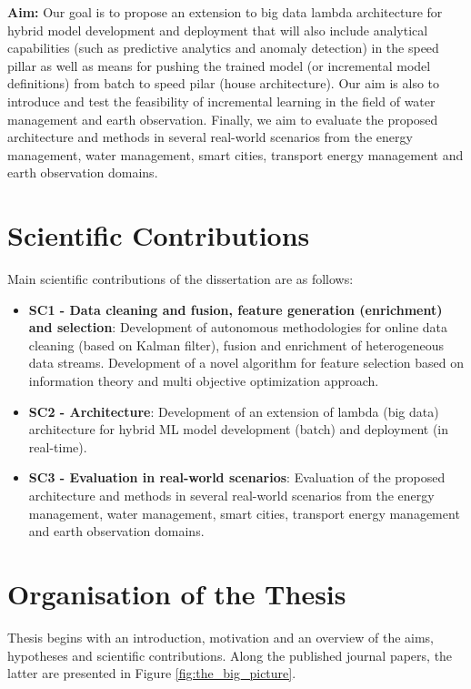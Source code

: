 \begin{itemize}
    \textbf{Aim:}
    Our goal is to propose an extension to big data lambda architecture for hybrid model development and deployment that will also include analytical capabilities (such as predictive analytics and anomaly detection) in the speed pillar as well as means for pushing the trained model (or incremental model definitions) from batch to speed pilar (house architecture).
    Our aim is also to introduce and test the feasibility of incremental learning in the field of water management and earth observation.
    Finally, we aim to evaluate the proposed architecture and methods in several real-world scenarios from the energy management, water management, smart cities, transport energy management and earth observation domains.
    
\end{itemize}

\section{Scientific Contributions}

Main scientific contributions of the dissertation are as follows:

\begin{itemize}    
    \item \textbf{SC1 - Data cleaning and fusion, feature generation (enrichment) and selection}: Development of autonomous methodologies for online data cleaning (based on Kalman filter), fusion and enrichment of heterogeneous data streams. Development of a novel algorithm for feature selection based on information theory and multi objective optimization approach.
    \item \textbf{SC2 - Architecture}: Development of an extension of lambda (big data) architecture for hybrid ML model development (batch) and deployment (in real-time).
    \item \textbf{SC3 - Evaluation in real-world scenarios}: Evaluation of the proposed architecture and methods in several real-world scenarios from the energy management, water management, smart cities, transport energy management and earth observation domains.
\end{itemize}

\section{Organisation of the Thesis}

Thesis begins with an introduction, motivation and an overview of the aims, hypotheses and scientific contributions.
Along the published journal papers, the latter are presented in Figure \ref{fig:the_big_picture}.

